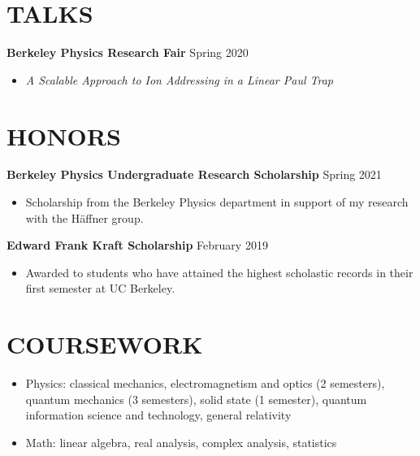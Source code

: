 \documentclass[margin, 10pt]{res} %
\begin{document}
\begin{resume}
\section{TALKS}
{\textbf{Berkeley Physics Research Fair}} \hfill Spring 2020
\begin{itemize}
    \item \textit{A Scalable Approach to Ion Addressing in a Linear Paul Trap}
\end{itemize}

\section{HONORS}

{\textbf{Berkeley Physics Undergraduate Research Scholarship}} \hfill Spring 2021
\begin{itemize}
    \item Scholarship from the Berkeley Physics department in support of my research with the H\"{a}ffner group.
\end{itemize}


{\textbf{Edward Frank Kraft Scholarship}} \hfill February 2019
\begin{itemize}
    \item Awarded to students who have attained the highest scholastic records in their first semester at UC Berkeley.
\end{itemize}

\section{COURSEWORK}

\begin{itemize}
\item Physics: classical mechanics, electromagnetism and optics (2 semesters), quantum mechanics (3 semesters), solid state (1 semester), quantum information science and technology, general relativity
\item Math: linear algebra, real analysis, complex analysis, statistics
\end{itemize}

\updateinfo


\end{resume}
\end{document}
